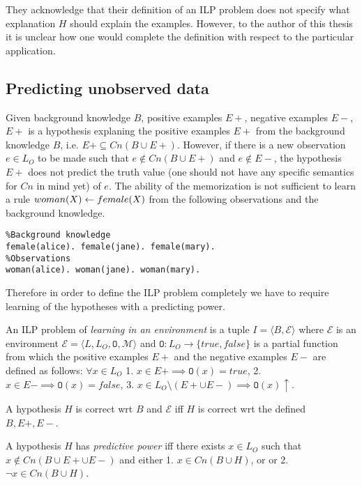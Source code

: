 They acknowledge that their definition of an ILP problem does not specify what explanation $H$ should explain the examples. However, to the author of this thesis it is unclear how one would complete the definition with respect to the particular application.

\subsection{Predicting unobserved data}
Given background knowledge $B$, positive examples $E+$, negative examples $E-$, $E+$ is a hypothesis explaning the positive examples $E+$ from the background knowledge $B$, i.e. $E+ \subseteq Cn(B \cup E+)$.
However, if there is a new observation $e \in L_O$ to be made such that
$e \not \in Cn(B \cup E+)$ and $e \not\in E-$, the hypothesis $E+$ does not predict the truth value (one should not have any specific semantics for $Cn$ in mind yet) of $e$. The ability of the memorization is not sufficient to learn a rule $woman(X) \leftarrow female(X)$ from the following observations and the background knowledge.
\begin{exmp}
\begin{lstlisting}
%Background knowledge
female(alice). female(jane). female(mary).
%Observations
woman(alice). woman(jane). woman(mary).
\end{lstlisting}
\end{exmp}

Therefore in order to define the ILP problem completely we have to require learning of the hypotheses with a predicting power.

\begin{defn}
An ILP problem of \emph{learning in an environment} is a tuple $I=\langle B, \mathcal{E} \rangle$ where
$\mathcal{E}$ is an environment
$\mathcal{E}=\langle L, L_O, \mathtt{O}, \mathcal{M} \rangle$
and 
$\mathtt{O}:L_O \to \{true, false\}$ is a partial function from which the positive examples $E+$ and the negative examples $E-$ are defined as follows:
$\forall x \in L_O$
1. $x \in E+ \implies \mathtt{O}(x)=true$,
2. $x \in E- \implies \mathtt{O}(x)=false$,
3. $x \in L_O \setminus (E+ \cup E-) \implies \mathtt{O}(x)\uparrow$.
\end{defn}

\begin{defn}
A hypothesis $H$ is correct wrt $B$ and $\mathcal{E}$ iff
$H$ is correct wrt the defined $B, E+, E-$.
\end{defn}

\begin{defn}
A hypothesis $H$ has \emph{predictive power} iff there exists
$x \in L_O$ such that $x \not \in Cn(B \cup E+ \cup E-)$
and either 1. $x \in Cn(B \cup H)$, or
or 2. $\neg x \in Cn(B \cup H)$.
\end{defn}

